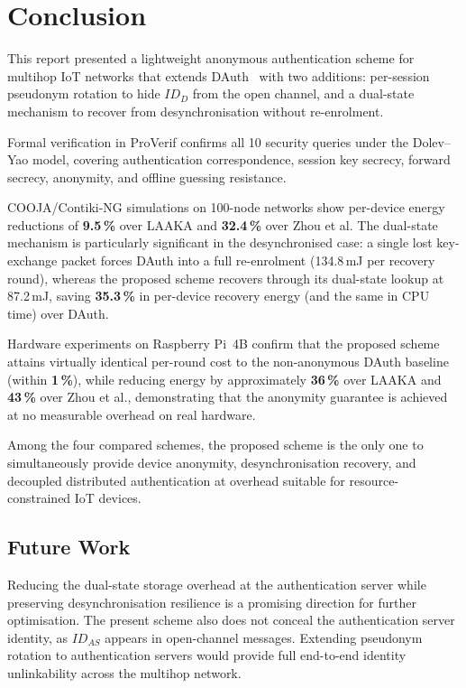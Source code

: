 \chapter{Conclusion}

\begin{singlespace}
This report presented a lightweight anonymous authentication scheme for multihop
IoT networks that extends DAuth~\cite{das2026comsnets} with two additions:
per-session pseudonym rotation to hide $ID_D$ from the open channel, and a dual-state
mechanism to recover from desynchronisation without re-enrolment.

Formal verification in ProVerif confirms all 10 security queries under the Dolev--Yao
model, covering authentication correspondence, session key secrecy, forward secrecy,
anonymity, and offline guessing resistance.

COOJA\slash Contiki-NG simulations on 100-node networks show per-device energy
reductions of \textbf{9.5\,\%} over LAAKA and \textbf{32.4\,\%} over Zhou et al.
The dual-state mechanism is particularly significant in the desynchronised case:
a single lost key-exchange packet forces DAuth into a full re-enrolment
(134.8\,mJ per recovery round), whereas the proposed scheme recovers through its
dual-state lookup at 87.2\,mJ, saving \textbf{35.3\,\%} in per-device recovery
energy (and the same in CPU time) over DAuth.

Hardware experiments on Raspberry Pi~4B confirm that the proposed scheme attains
virtually identical per-round cost to the non-anonymous DAuth baseline (within
\textbf{1\,\%}), while reducing energy by approximately \textbf{36\,\%} over LAAKA
and \textbf{43\,\%} over Zhou et al., demonstrating that the anonymity guarantee is
achieved at no measurable overhead on real hardware.

Among the four compared schemes, the proposed scheme is the only one to simultaneously
provide device anonymity, desynchronisation recovery, and decoupled distributed
authentication at overhead suitable for resource-constrained IoT devices.
\end{singlespace}

\section{Future Work}

Reducing the dual-state storage overhead at the authentication server while
preserving desynchronisation resilience is a promising direction for further
optimisation.
The present scheme also does not conceal the authentication server identity, as
$ID_{AS}$ appears in open-channel messages.
Extending pseudonym rotation to authentication servers would provide full
end-to-end identity unlinkability across the multihop network.

